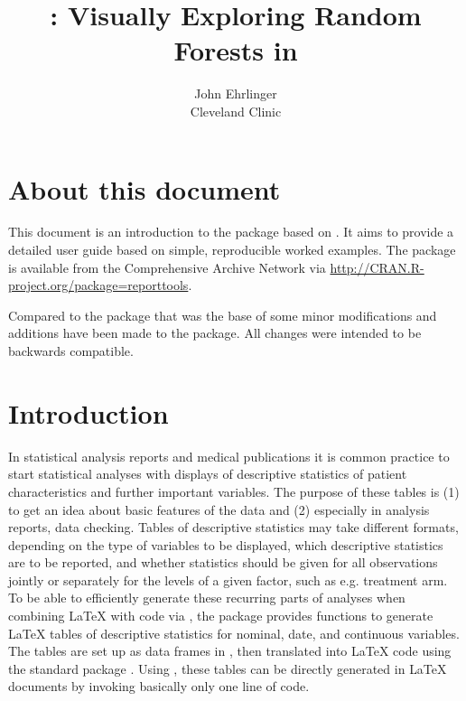 \documentclass[nojss]{jss}\usepackage[]{graphicx}\usepackage[]{color}
\author{John Ehrlinger\\Cleveland Clinic} %
\title{{\pkg{ggRandomForests}}: Visually Exploring Random Forests in \proglang{R}}
\begin{document}



\section{About this document}
This document is an introduction to the  package
 \citep{reporttools} based on \citet{Rufibach:2009}. It aims to provide a detailed user guide 
based on simple, reproducible worked examples. The  package is available from the
Comprehensive  Archive Network via \url{http://CRAN.R-project.org/package=reporttools}.

Compared to the package that was the base of \citet{Rufibach:2009} some minor modifications and additions 
have been made to the package. All changes were intended to be backwards compatible.


\section{Introduction}
In statistical analysis reports and medical publications it is common practice to start statistical analyses with 
displays of descriptive statistics of patient characteristics and further important variables. 
The purpose of these tables is (1) to get an idea about basic features of the data and (2) especially in 
analysis reports, data checking.
Tables of descriptive statistics may take different formats, depending on the type of 
variables to be displayed, which descriptive statistics are to be reported, and whether statistics should be given
for all observations jointly or separately for the levels of a given factor, such as e.g. treatment arm. 
To be able to efficiently generate these recurring parts of analyses when combining {\LaTeX}
\citep{knuth_84, lamport_94} with  \citep{R} code via  \citep{leisch_02}, the  package  
provides functions to generate {\LaTeX} tables of descriptive statistics for nominal, date,
and continuous variables.
The tables are set up as data frames in , then translated into {\LaTeX} code
using the standard  package  \citep{xtable}. Using , these tables can be directly generated
in {\LaTeX} documents by invoking basically only one line of  code.
\end{document}
